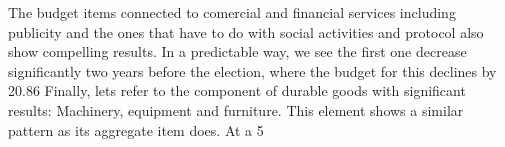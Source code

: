 	The budget items connected to comercial and financial services including publicity and the ones that have to do with social activities and protocol also show compelling results. In a predictable way, we see the first one decrease significantly two years before the election, where the budget for this declines by 20.86%
	Finally, lets refer to the component of durable goods with significant results: Machinery, equipment and furniture. This element shows a similar pattern as its aggregate item does. At a 5%
	


